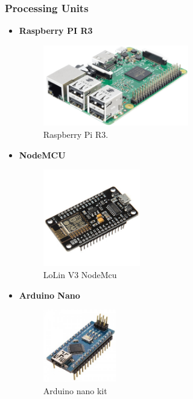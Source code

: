 \documentclass[12pt]{article}
\begin{document}
\subsubsection{Processing Units}
\begin{itemize}
	\item \textbf{Raspberry PI R3}\\
	\begin{figure}[H]
		\centering
		\includegraphics[width =0.6\textwidth]{Fig/Electronics/Raspberry.png}
		\caption{Raspberry Pi R3.}
		\label{fig:raspberry}
	\end{figure}

	\item \textbf{NodeMCU}\\
	\begin{figure}[H]
		\centering
		\includegraphics[width =0.4\textwidth]{Fig/Electronics/nodemcu.jpg}
		\caption{LoLin V3 NodeMcu}
		\label{fig:nodemcu}
	\end{figure}
	
	\item \textbf{Arduino Nano}\\
	\begin{figure}[H]
		\centering
		\includegraphics[width =0.3\textwidth]{Fig/Electronics/nano.jpg}
		\caption{Arduino nano kit}
		\label{fig:nano}
	\end{figure}

\end{itemize}
\end{document}
